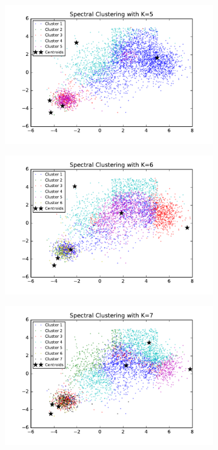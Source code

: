 \begin{description}
\begin{description}
\begin{figure}[!h]
\begin{subfigure}[b]{0.475\textwidth}
            \includegraphics[width=\textwidth]{./figures/bigClustering_spectral_5.pdf}
        \end{subfigure}
        \hfill
        \begin{subfigure}[b]{0.475\textwidth}   
            \centering 
            \includegraphics[width=\textwidth]{./figures/bigClustering_spectral_6.pdf}
        \end{subfigure}
        \begin{subfigure}[b]{0.475\textwidth}   
            \centering 
            \includegraphics[width=\textwidth]{./figures/bigClustering_spectral_7.pdf}

\end{subfigure}
\end{figure}
\end{description}
\end{description}
